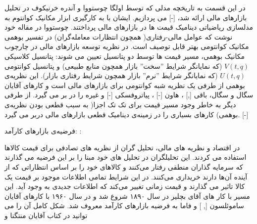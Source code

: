 \documentclass[a4paper,titlepage,12pt,fleqn,oneside]{report}
\begin{document}
  در این قسمت به تاریخچه مدلی که توسط اولگا چوستووا و آندره خرنیکوف در تحلیل بازارهای مالی ارائه شد، [-] می پردازیم.  ایشان با به کارگیری ابزار مکانیک کوانتوم به مدلسازی ریاضیاتی دینامیک قیمت ها در بازارهای مالی پرداختند. چوستووا در مقاله خود نوشت که عوامل مالی-رفتاری( همچون انتظارات معامله‌گران)  در تفسیر بوهمی مکانیک کوانتومی بهتر قابل توصیف است.  در نظریه توسعه بازارهای مالی در چارچوب مکانیک بوهمی،  مسیر قیمت ها توسط دو پتانسیل تعیین می شوند: پتانسیل کلاسیکی$V(t,q)$ (که نمایانگر شرایط ''سخت'' بازار همچون منابع طبیعی) و پتانسیل کوانتومی$U(t,q)$ (که نمایانگر شرایط ''نرم'' بازار همچون شرایط رفتاری بازار).  این نظریه‌ی بوهمی از طرفی یک نظریه شبه کوانتومی برای بازارهای مالی است و کارهای آقایان سگال و سگال\cite{seg}،
   باقی [,]
   ، هاون [-]
   ، پیاتروفسکی [-]
   و غیره  را در بر می گیرد.  از طرفی دیگر به خاطر وجود مسیر قیمت برای تک تک اجزا( به سبب
   قطعی بودن نظریه‌ی بوهمی) کارهای بسیاری را در زمینه‌ی دینامیک قطعی بازارهای مالی دربر می گیرد.  [-]
  
   فرضیه‌ی بازارهای کارآمد:
:
   
   
  در اقتصاد و نظریه های مالی،  تحلیل گران از نظریه های تصادفی برای قیمت کالاها استفاده می کردند.  این تحلیلگران در تحلیل های خود مبنا را بر این فرضیه می گذارند که سرمایه گذاران منطقی رفتار می‌کنند و کالاهای خود را بر اساس انتظاراتی که از آینده آن‌ها دارند خریداری می‌کنند.  در این شرایط تمامی اطلاعات موجود بر قیمت یک کالا تاثیر می گذارند و قیمت زمانی تغییر می‌کند که اطلاعات جدیدی به وجود آید.  این مسیر با کار های آقای بچلیر \cite{bac} در سال ۱۸۹۰  شروع شد و در سال ۱۹۶۰ با کارهای آقایان ساموئلسون [, ] و فاما \cite{fama} به فرضیه بازارهای کارآمد معروف شد.  شکل کامل آن را می توانید در کتاب آقایان منتگنا و 
  
\end{document}
